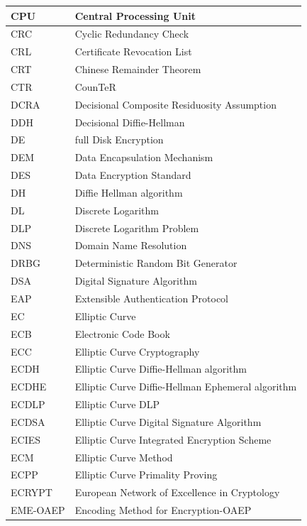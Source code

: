\documentclass[a4paper, 12pt]{book} %
\begin{document}
\begin{longtable}{||lp{11cm}||}
    CPU & Central Processing Unit \\ \hline 
    CRC & Cyclic Redundancy Check \\ \hline 
    CRL & Certificate Revocation List \\ \hline 
    CRT & Chinese Remainder Theorem \\ \hline 
    CTR & CounTeR \\ \hline 
    DCRA & Decisional Composite Residuosity Assumption \\ \hline 
    DDH & Decisional Diffie-Hellman \\ \hline 
    DE & full Disk Encryption \\ \hline 
    DEM & Data Encapsulation Mechanism \\ \hline 
    DES & Data Encryption Standard \\ \hline
    DH & Diffie Hellman algorithm \\ \hline 
    DL & Discrete Logarithm \\ \hline 
    DLP & Discrete Logarithm Problem \\ \hline 
    DNS & Domain Name Resolution \\ \hline
    DRBG & Deterministic Random Bit Generator \\ \hline 
    DSA & Digital Signature Algorithm \\ \hline 
    EAP & Extensible Authentication Protocol \\ \hline 
    EC & Elliptic Curve \\ \hline 
    ECB & Electronic Code Book \\ \hline 
    ECC & Elliptic Curve Cryptography \\ \hline 
    ECDH & Elliptic Curve Diffie-Hellman algorithm \\ \hline 
    ECDHE & Elliptic Curve Diffie-Hellman Ephemeral algorithm \\ \hline 
    ECDLP & Elliptic Curve DLP \\ \hline 
    ECDSA & Elliptic Curve Digital Signature Algorithm \\ \hline 
    ECIES & Elliptic Curve Integrated Encryption Scheme \\ \hline 
    ECM & Elliptic Curve Method \\ \hline 
    ECPP & Elliptic Curve Primality Proving \\ \hline 
    ECRYPT & European Network of Excellence in Cryptology \\ \hline 
    EME-OAEP & Encoding Method for Encryption-OAEP \\ \hline 

\end{longtable}
\end{document}

